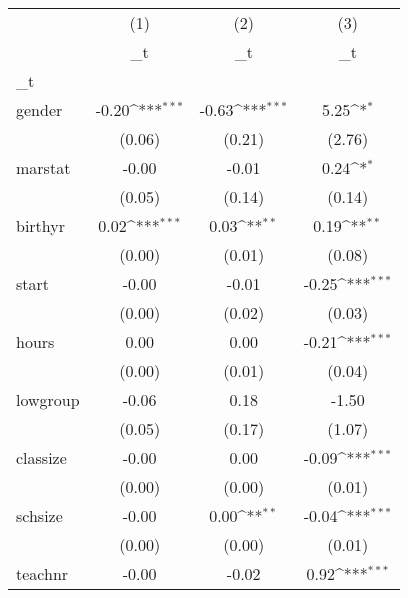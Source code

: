 \documentclass{article}
\begin{document}
{
\def\sym#1{\ifmmode^{#1}\else\(^{#1}\)\fi}
\begin{tabular}{l*{3}{c}}
\hline\hline
            &\multicolumn{1}{c}{(1)}&\multicolumn{1}{c}{(2)}&\multicolumn{1}{c}{(3)}\\
            &\multicolumn{1}{c}{\_t}&\multicolumn{1}{c}{\_t}&\multicolumn{1}{c}{\_t}\\
\hline
\_t          &                     &                     &                     \\
gender      &       -0.20\sym{***}&       -0.63\sym{***}&        5.25\sym{*}  \\
            &      (0.06)         &      (0.21)         &      (2.76)         \\
[1em]
marstat     &       -0.00         &       -0.01         &        0.24\sym{*}  \\
            &      (0.05)         &      (0.14)         &      (0.14)         \\
[1em]
birthyr     &        0.02\sym{***}&        0.03\sym{**} &        0.19\sym{**} \\
            &      (0.00)         &      (0.01)         &      (0.08)         \\
[1em]
start       &       -0.00         &       -0.01         &       -0.25\sym{***}\\
            &      (0.00)         &      (0.02)         &      (0.03)         \\
[1em]
hours       &        0.00         &        0.00         &       -0.21\sym{***}\\
            &      (0.00)         &      (0.01)         &      (0.04)         \\
[1em]
lowgroup    &       -0.06         &        0.18         &       -1.50         \\
            &      (0.05)         &      (0.17)         &      (1.07)         \\
[1em]
classize    &       -0.00         &        0.00         &       -0.09\sym{***}\\
            &      (0.00)         &      (0.00)         &      (0.01)         \\
[1em]
schsize     &       -0.00         &        0.00\sym{**} &       -0.04\sym{***}\\
            &      (0.00)         &      (0.00)         &      (0.01)         \\
[1em]
teachnr     &       -0.00         &       -0.02         &        0.92\sym{***}\\

\end{tabular}}
\end{document}
